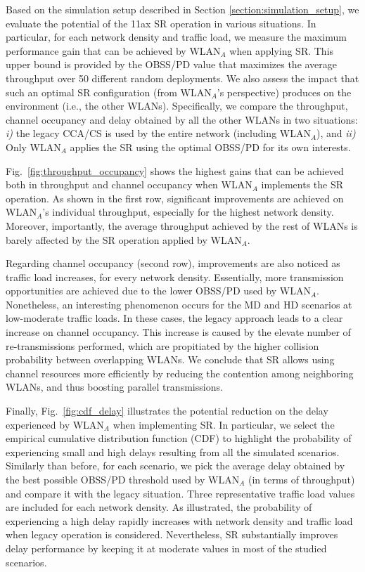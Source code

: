 \documentclass[conference]{IEEEtran}
\begin{document}
	Based on the simulation setup described in Section \ref{section:simulation_setup}, we evaluate the potential of the 11ax SR operation in various situations. In particular, for each network density and traffic load, we measure the maximum performance gain that can be achieved by WLAN$_A$ when applying SR. This upper bound is provided by the OBSS/PD value that maximizes the average throughput over 50 different random deployments. We also assess the impact that such an optimal SR configuration (from WLAN$_A$'s perspective) produces on the environment (i.e., the other WLANs). Specifically, we compare the throughput, channel occupancy and delay obtained by all the other WLANs in two situations: \emph{i)} the legacy CCA/CS is used by the entire network (including WLAN$_A$), and \emph{ii)} Only WLAN$_A$ applies the SR using the optimal OBSS/PD for its own interests.
	
	Fig.~\ref{fig:throughput_occupancy} shows the highest gains that can be achieved both in throughput and channel occupancy when WLAN$_A$ implements the SR operation. As shown in the first row, significant improvements are achieved on WLAN$_A$'s individual throughput, especially for the highest network density. Moreover, importantly, the average throughput achieved by the rest of WLANs is barely affected by the SR operation applied by WLAN$_A$. 
	
	Regarding channel occupancy (second row), improvements are also noticed as traffic load increases, for every network density. Essentially, more transmission opportunities are achieved due to the lower OBSS/PD used by WLAN$_A$. Nonetheless, an interesting phenomenon occurs for the MD and HD scenarios at low-moderate traffic loads. In these cases, the legacy approach leads to a clear increase on channel occupancy. This increase is caused by the elevate number of re-transmissions performed, which are propitiated by the higher collision probability between overlapping WLANs. We conclude that SR allows using channel resources more efficiently by reducing the contention among neighboring WLANs, and thus boosting parallel transmissions.
	
	Finally, Fig.~\ref{fig:cdf_delay} illustrates the potential reduction on the delay experienced by WLAN$_A$ when implementing SR. In particular, we select the empirical cumulative distribution function (CDF) to highlight the probability of experiencing small and high delays resulting from all the simulated scenarios. Similarly than before, for each scenario, we pick the average delay obtained by the best possible OBSS/PD threshold used by WLAN$_A$ (in terms of throughput) and compare it with the legacy situation. Three representative traffic load values are included for each network density. As illustrated, the probability of experiencing a high delay rapidly increases with network density and traffic load when legacy operation is considered. Nevertheless, SR substantially improves delay performance by keeping it at moderate values in most of the studied scenarios.
	
\end{document}
